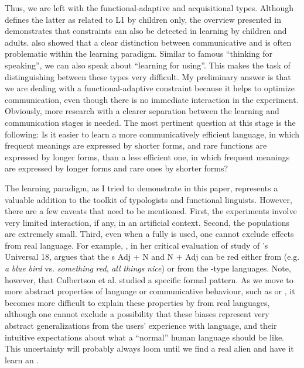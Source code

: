 \documentclass[output=paper]{langsci/langscibook}
\begin{document}
Thus, we are left with the functional-adaptive and acquisitional types. Although  defines the latter as related to L1 by children only, the overview presented in  demonstrates that  constraints can also be detected in  learning by children and adults.  also showed that a clear distinction between communicative  and  is often problematic within the  learning paradigm. Similar to  famous “thinking for speaking”, we can also speak about “learning for using”. This makes the task of distinguishing between these types very difficult. My preliminary answer is that we are dealing with a functional-adaptive constraint because it helps to optimize communication, even though there is no immediate interaction in the experiment. Obviously, more research with a clearer separation between the learning and communication stages is needed. The most pertinent question at this stage is the following: Is it easier to learn a more communicatively efficient language, in which frequent meanings are expressed by shorter forms, and rare functions are expressed by longer forms, than a less efficient one, in which frequent meanings are expressed by longer forms and rare ones by shorter forms?

The  learning paradigm, as I tried to demonstrate in this paper, represents a valuable addition to the toolkit of typologists and functional linguists. However, there are a few caveats that need to be mentioned. First, the experiments involve very limited interaction, if any, in an artificial context. Second, the populations are extremely small. Third, even when a fully  is used, one cannot exclude  effects from real language. For example, \citet{Goldberg2013}, in her critical evaluation of  study of ’s Universal 18, argues that the s Adj + N and N + Adj can be red either from  (e.g. \textit{a} \textit{blue} \textit{bird} vs. \textit{something} \textit{red}, \textit{all} \textit{things} \textit{nice}) or from the -type languages. Note, however, that Culbertson et al. studied a specific formal pattern. As we move to more abstract properties of language or communicative behaviour, such as  or , it becomes more difficult to explain these properties by  from real languages, although one cannot exclude a possibility that these biases represent very abstract generalizations from the users’ experience with language, and their intuitive expectations about what a “normal” human language should be like. This uncertainty will probably always loom until we find a real alien and have it learn an . 
\end{document}
